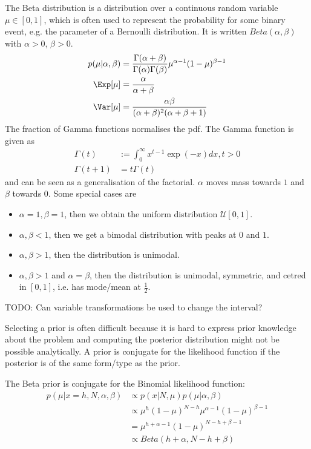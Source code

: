 The Beta distribution is a distribution over a continuous random variable
$\mu \in [0, 1]$, which is often used to represent the probability for
some binary event, e.g. the parameter of a Bernoulli distribution.
It is written $Beta(\alpha, \beta)$ with $\alpha > 0$, $\beta > 0$.
\begin{align*}
    p(\mu | \alpha, \beta) &=
        \frac{\Gamma(\alpha + \beta)}{\Gamma(\alpha)\Gamma(\beta)}
        \mu^{\alpha - 1} (1 - \mu)^{\beta - 1} \\
    \Exp[\mu] &= \frac{\alpha}{\alpha + \beta} \\
    \Var[\mu] &= \frac{\alpha \beta}{
        (\alpha + \beta)^2 (\alpha + \beta + 1)
    }
\end{align*}
The fraction of Gamma functions normalises the pdf.
The Gamma function is given as
\begin{align*}
    \Gamma(t) &:= \int_0^\infty{x^{t-1} \exp(-x) dx}, t > 0 \\
    \Gamma(t + 1) &= t \Gamma(t)
\end{align*}
and can be seen as a generalisation of the factorial.
$\alpha$ moves mass towards $1$ and $\beta$ towards $0$.
Some special cases are
\begin{itemize}
    \item $\alpha = 1, \beta = 1$, then we obtain the uniform distribution
        $\mathcal{U}[0, 1]$.
    \item $\alpha, \beta < 1$, then we get a bimodal distribution with
        peaks at $0$ and $1$.
    \item $\alpha, \beta > 1$, then the distribution is unimodal.
    \item $\alpha, \beta > 1$ and $\alpha = \beta$, then the distribution
        is unimodal, symmetric, and cetred in $[0, 1]$, i.e. has
        mode/mean at $\frac{1}{2}$.
\end{itemize}

TODO: Can variable transformations be used to change the interval?

Selecting a prior is often difficult because it is hard to express
prior knowledge about the problem and computing the posterior distribution
might not be possible analytically.
A prior is conjugate for the likelihood function if the posterior is
of the same form/type as the prior.

The Beta prior is conjugate for the Binomial likelihood function:
\begin{align*}
    p(\mu | x = h, N, \alpha, \beta) &\propto p(x | N, \mu) p(\mu | \alpha, \beta) \\
    &\propto \mu^h (1 - \mu)^{N - h} \mu^{\alpha - 1} (1-\mu)^{\beta - 1} \\
    &= \mu^{h + \alpha - 1} (1 - \mu)^{N - h + \beta - 1} \\
    &\propto Beta(h + \alpha, N - h + \beta)
\end{align*}

